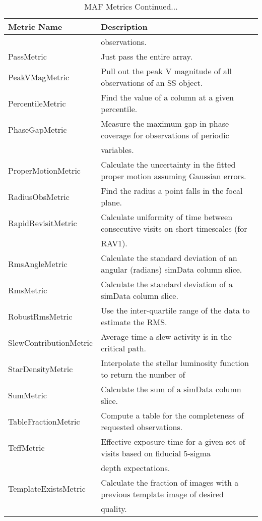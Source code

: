\begin{table}
\scriptsize
\caption{MAF Metrics Continued...}
\begin{tabular}{ll}
\hline
            Metric Name &                                                                       Description \\
\hline
  &  observations. \\
 PassMetric &  Just pass the entire array. \\
 PeakVMagMetric &  Pull out the peak V magnitude of all observations of an SS object. \\
 PercentileMetric &  Find the value of a column at a given percentile. \\
 PhaseGapMetric &  Measure the maximum gap in phase coverage for observations of periodic \\
  &  variables. \\
 ProperMotionMetric &  Calculate the uncertainty in the fitted proper motion assuming Gaussian errors. \\
 RadiusObsMetric &  Find the radius a point falls in the focal plane. \\
 RapidRevisitMetric &  Calculate uniformity of time between consecutive visits on short timescales (for \\
  &  RAV1). \\
 RmsAngleMetric &  Calculate the standard deviation of an angular (radians) simData column slice. \\
 RmsMetric &  Calculate the standard deviation of a simData column slice. \\
 RobustRmsMetric &  Use the inter-quartile range of the data to estimate the RMS. \\
 SlewContributionMetric &  Average time a slew activity is in the critical path. \\
 StarDensityMetric &  Interpolate the stellar luminosity function to return the number of \\
 SumMetric &  Calculate the sum of a simData column slice. \\
 TableFractionMetric &  Compute a table for the completeness of requested observations. \\
 TeffMetric &  Effective exposure time for a given set of visits based on fiducial 5-sigma \\
  &  depth expectations. \\
 TemplateExistsMetric &  Calculate the fraction of images with a previous template image of desired \\
  &  quality. \\

\end{tabular}
\end{table}
